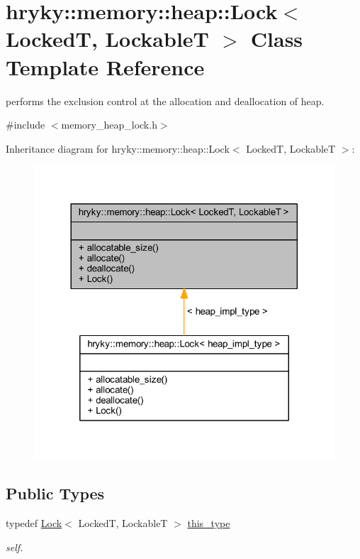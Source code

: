 \hypertarget{classhryky_1_1memory_1_1heap_1_1_lock}{\section{hryky\-:\-:memory\-:\-:heap\-:\-:Lock$<$ Locked\-T, Lockable\-T $>$ Class Template Reference}
\label{classhryky_1_1memory_1_1heap_1_1_lock}
}


performs the exclusion control at the allocation and deallocation of heap.  




{\ttfamily \#include $<$memory\-\_\-heap\-\_\-lock.\-h$>$}



Inheritance diagram for hryky\-:\-:memory\-:\-:heap\-:\-:Lock$<$ Locked\-T, Lockable\-T $>$\-:\nopagebreak
\begin{figure}[H]
\begin{center}
\leavevmode
\includegraphics[width=320pt]{classhryky_1_1memory_1_1heap_1_1_lock__inherit__graph}
\end{center}
\end{figure}
\subsection*{Public Types}
\begin{DoxyCompactItemize}
\item 
\hypertarget{classhryky_1_1memory_1_1heap_1_1_lock_a4642d966c65ca6effb49a3db58426449}{typedef \hyperlink{classhryky_1_1memory_1_1heap_1_1_lock}{Lock}$<$ Locked\-T, Lockable\-T $>$ \hyperlink{classhryky_1_1memory_1_1heap_1_1_lock_a4642d966c65ca6effb49a3db58426449}{this\-\_\-type}}\label{classhryky_1_1memory_1_1heap_1_1_lock_a4642d966c65ca6effb49a3db58426449}

\begin{DoxyCompactList}\small\item\em self. \end{DoxyCompactList}\end{DoxyCompactItemize}

